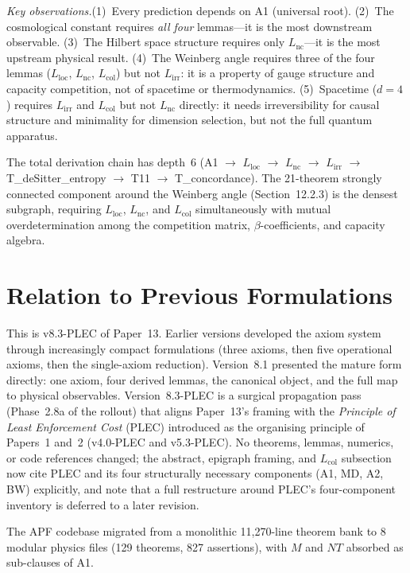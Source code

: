 \documentclass[11pt]{article}
\newcommand{\Lnc}{L_{\mathrm{nc}}}
\newcommand{\Lloc}{L_{\mathrm{loc}}}
\newcommand{\Lirr}{L_{\mathrm{irr}}}
\newcommand{\Lcol}{L_{\mathrm{col}}}
\begin{document}
\noindent\textit{Key observations.}\quad (1)~Every prediction depends on A1 (universal root).  (2)~The cosmological constant requires \emph{all four} lemmas---it is the most downstream observable.  (3)~The Hilbert space structure requires only $\Lnc$---it is the most upstream physical result.  (4)~The Weinberg angle requires three of the four lemmas ($\Lloc$, $\Lnc$, $\Lcol$) but not $\Lirr$: it is a property of gauge structure and capacity competition, not of spacetime or thermodynamics.  (5)~Spacetime ($d = 4$) requires $\Lirr$ and $\Lcol$ but not $\Lnc$ directly: it needs irreversibility for causal structure and minimality for dimension selection, but not the full quantum apparatus.

The total derivation chain has depth~6 (A1 $\to$ $\Lloc$ $\to$ $\Lnc$ $\to$ $\Lirr$ $\to$ T\_deSitter\_entropy $\to$ T11 $\to$ T\_concordance).  The 21-theorem strongly connected component around the Weinberg angle (Section~12.2.3) is the densest subgraph, requiring $\Lloc$, $\Lnc$, and $\Lcol$ simultaneously with mutual overdetermination among the competition matrix, $\beta$-coefficients, and capacity algebra.


\section{Relation to Previous Formulations}

This is v8.3-PLEC of Paper~13.  Earlier versions developed the axiom system through increasingly compact formulations (three axioms, then five operational axioms, then the single-axiom reduction).  Version~8.1 presented the mature form directly: one axiom, four derived lemmas, the canonical object, and the full map to physical observables.  Version~8.3-PLEC is a surgical propagation pass (Phase~2.8a of the rollout) that aligns Paper~13's framing with the \emph{Principle of Least Enforcement Cost} (PLEC) introduced as the organising principle of Papers~1 and~2 (v4.0-PLEC and v5.3-PLEC).  No theorems, lemmas, numerics, or code references changed; the abstract, epigraph framing, and $L_{\mathrm{col}}$ subsection now cite PLEC and its four structurally necessary components (A1, MD, A2, BW) explicitly, and note that a full restructure around PLEC's four-component inventory is deferred to a later revision.

The APF codebase migrated from a monolithic 11,270-line theorem bank to 8 modular physics files (129 theorems, 827 assertions), with $M$ and $NT$ absorbed as sub-clauses of A1.
\end{document}
